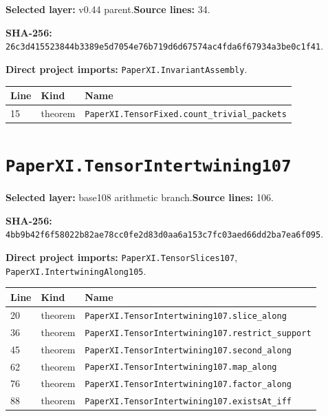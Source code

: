 \documentclass[10pt,oneside]{book}
\begin{document}
\textbf{Selected layer:} v0.44 parent.\quad\textbf{Source lines:} 34.\par\textbf{SHA-256:} {\scriptsize\nolinkurl{26c3d415523844b3389e5d7054e76b719d6d67574ac4fda6f67934a3be0c1f41}}.


\textbf{Direct project imports:} \nolinkurl{PaperXI.InvariantAssembly}.

\begin{longtable}{@{}p{}p{}p{}@{}}\toprule Line&Kind&Name\\\midrule\endhead

15&theorem&\nolinkurl{PaperXI.TensorFixed.count_trivial_packets}\\

\bottomrule\end{longtable}

\section{\texorpdfstring{\nolinkurl{PaperXI.TensorIntertwining107}}{PaperXI.TensorIntertwining107}}\label{module:PaperXI.TensorIntertwining107}

\textbf{Selected layer:} base108 arithmetic branch.\quad\textbf{Source lines:} 106.\par\textbf{SHA-256:} {\scriptsize\nolinkurl{4bb9b42f6f58022b82ae78cc0fe2d83d0aa6a153c7fc03aed66dd2ba7ea6f095}}.


\textbf{Direct project imports:} \nolinkurl{PaperXI.TensorSlices107}, \nolinkurl{PaperXI.IntertwiningAlong105}.

\begin{longtable}{@{}p{}p{}p{}@{}}\toprule Line&Kind&Name\\\midrule\endhead

20&theorem&\nolinkurl{PaperXI.TensorIntertwining107.slice_along}\\

36&theorem&\nolinkurl{PaperXI.TensorIntertwining107.restrict_support}\\

45&theorem&\nolinkurl{PaperXI.TensorIntertwining107.second_along}\\

62&theorem&\nolinkurl{PaperXI.TensorIntertwining107.map_along}\\

76&theorem&\nolinkurl{PaperXI.TensorIntertwining107.factor_along}\\

88&theorem&\nolinkurl{PaperXI.TensorIntertwining107.existsAt_iff}\\

\bottomrule\end{longtable}
\end{document}
